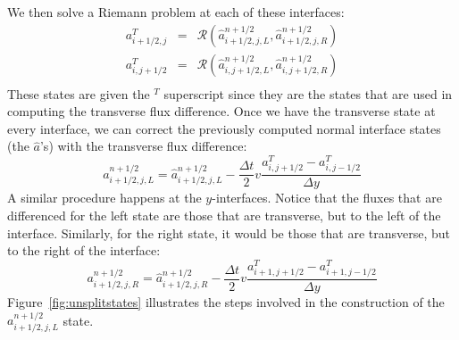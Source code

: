 We then solve a Riemann problem at each of these interfaces:
\begin{eqnarray}
a^T_{i+1/2,j} &=& \mathcal{R}(\hat{a}_{i+1/2,j,L}^{n+1/2},
                              \hat{a}_{i+1/2,j,R}^{n+1/2}) \\
a^T_{i,j+1/2} &=& \mathcal{R}(\hat{a}_{i,j+1/2,L}^{n+1/2},
                              \hat{a}_{i,j+1/2,R}^{n+1/2}) \\
\end{eqnarray}
These states are given the $^T$ superscript since they are the states
that are used in computing the transverse flux difference.  Once we
have the transverse state at every interface, we can correct the 
previously computed normal interface states (the $\hat{a}$'s) with
the transverse flux difference:
\begin{equation}
a_{i+1/2,j,L}^{n+1/2} = \hat{a}_{i+1/2,j,L}^{n+1/2} 
   - \frac{\Delta t}{2} v \frac{a^T_{i,j+1/2} - a^T_{i,j-1/2}}{\Delta y}
\end{equation}
A similar procedure happens at the $y$-interfaces.  Notice that the
fluxes that are differenced for the left state are those that are
transverse, but to the left of the interface.  Similarly, for the
right state, it would be those that are transverse, but to the right
of the interface:
\begin{equation}
a_{i+1/2,j,R}^{n+1/2} = \hat{a}_{i+1/2,j,R}^{n+1/2} 
   - \frac{\Delta t}{2} v \frac{a^T_{i+1,j+1/2} - a^T_{i+1,j-1/2}}{\Delta y}
\end{equation}
Figure~\ref{fig:unsplitstates} illustrates the steps involved in
the construction of the $a_{i+1/2,j,L}^{n+1/2}$ state.
%
